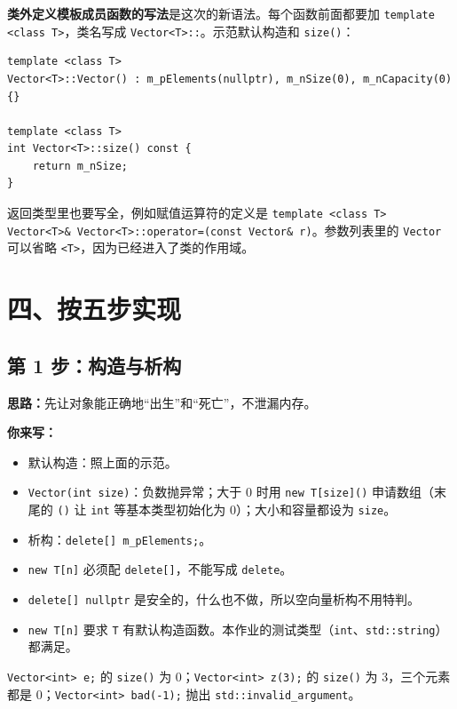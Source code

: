 \documentclass[11pt,a4paper]{article}
\newcommand{\code}[1]{\texttt{#1}}
\newcommand{\idea}{\textbf{思路：}}
\newcommand{\todo}{\textbf{你来写：}}
\begin{document}
\textbf{类外定义模板成员函数的写法}是这次的新语法。每个函数前面都要加 \code{template <class T>}，类名写成 \code{Vector<T>::}。示范默认构造和 \code{size()}：

\begin{lstlisting}
template <class T>
Vector<T>::Vector() : m_pElements(nullptr), m_nSize(0), m_nCapacity(0) {}

template <class T>
int Vector<T>::size() const {
    return m_nSize;
}
\end{lstlisting}

返回类型里也要写全，例如赋值运算符的定义是 \code{template <class T> Vector<T>\& Vector<T>::operator=(const Vector\& r)}。参数列表里的 \code{Vector} 可以省略 \code{<T>}，因为已经进入了类的作用域。

\section{四、按五步实现}

\subsection{第 1 步：构造与析构}

\idea 先让对象能正确地“出生”和“死亡”，不泄漏内存。

\todo
\begin{itemize}
  \item 默认构造：照上面的示范。
  \item \code{Vector(int size)}：负数抛异常；大于 0 时用 \code{new T[size]()} 申请数组（末尾的 \code{()} 让 \code{int} 等基本类型初始化为 0）；大小和容量都设为 \code{size}。
  \item 析构：\code{delete[] m\_pElements;}。
\end{itemize}

\begin{tip}
\begin{itemize}[leftmargin=1.2em]
  \item \code{new T[n]} 必须配 \code{delete[]}，不能写成 \code{delete}。
  \item \code{delete[] nullptr} 是安全的，什么也不做，所以空向量析构不用特判。
  \item \code{new T[n]} 要求 \code{T} 有默认构造函数。本作业的测试类型（\code{int}、\code{std::string}）都满足。
\end{itemize}
\end{tip}

\begin{done}
\code{Vector<int> e;} 的 \code{size()} 为 0；\code{Vector<int> z(3);} 的 \code{size()} 为 3，三个元素都是 0；\code{Vector<int> bad(-1);} 抛出 \code{std::invalid\_argument}。
\end{done}
\end{document}
